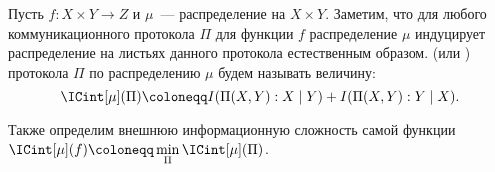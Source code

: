 






\begin{definition*}
    Пусть $f\colon X \times Y \to Z$ и $\mu$~--- распределение на $X \times Y$. Заметим, что для любого
    коммуникационного протокола $\Pi$ для функции $f$ распределение $\mu$ индуцирует распределение на
    листьях данного протокола естественным образом.  (или
    ) протокола $\Pi$ по распределению $\mu$ будем называть
    величину:
    $$\ICint[\mu](\Pi) \coloneqq I(\Pi(X, Y) : X \mid Y) + I(\Pi(X, Y) : Y \mid X).$$
    
    Также определим внешнюю информационную сложность самой функции
    $\ICint[\mu](f) \coloneqq \min\limits_{\Pi} \ICint[\mu](\Pi)$.
\end{definition*}









